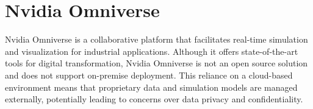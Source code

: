 \section{Nvidia Omniverse}
Nvidia Omniverse is a collaborative platform that facilitates real-time simulation and visualization for industrial applications. \cite{nvidia-2025} Although it offers state-of-the-art tools for digital transformation, Nvidia Omniverse is not an open source solution and does not support on-premise deployment. This reliance on a cloud-based environment means that proprietary data and simulation models are managed externally, potentially leading to concerns over data privacy and confidentiality.
